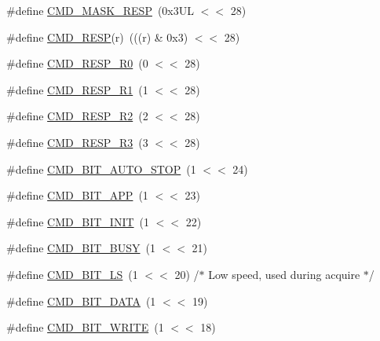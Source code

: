 \begin{DoxyCompactItemize}
\item 
\#define \hyperlink{group___s_d_m_m_c__18_x_x__43_x_x_gab956d2cc0062315242a2ccd388f1e358}{C\+M\+D\+\_\+\+M\+A\+S\+K\+\_\+\+R\+E\+SP}~(0x3\+U\+L $<$$<$ 28)
\item 
\#define \hyperlink{group___s_d_m_m_c__18_x_x__43_x_x_ga91c1b8c0d47030e80d4ff6259b169175}{C\+M\+D\+\_\+\+R\+E\+SP}(r)~(((r) \& 0x3) $<$$<$ 28)
\item 
\#define \hyperlink{group___s_d_m_m_c__18_x_x__43_x_x_ga8a85b87724ffe5fa4d558ae128f21585}{C\+M\+D\+\_\+\+R\+E\+S\+P\+\_\+\+R0}~(0 $<$$<$ 28)
\item 
\#define \hyperlink{group___s_d_m_m_c__18_x_x__43_x_x_ga6f03bbba43ba479f018f7ef76e2258f5}{C\+M\+D\+\_\+\+R\+E\+S\+P\+\_\+\+R1}~(1 $<$$<$ 28)
\item 
\#define \hyperlink{group___s_d_m_m_c__18_x_x__43_x_x_ga3e9cc9d9af65b99b95dc6139a3db322a}{C\+M\+D\+\_\+\+R\+E\+S\+P\+\_\+\+R2}~(2 $<$$<$ 28)
\item 
\#define \hyperlink{group___s_d_m_m_c__18_x_x__43_x_x_gaa401bdbd962023c1773d917a2c99b110}{C\+M\+D\+\_\+\+R\+E\+S\+P\+\_\+\+R3}~(3 $<$$<$ 28)
\item 
\#define \hyperlink{group___s_d_m_m_c__18_x_x__43_x_x_ga54467a0e80fd68c54419d4e6598c05d8}{C\+M\+D\+\_\+\+B\+I\+T\+\_\+\+A\+U\+T\+O\+\_\+\+S\+T\+OP}~(1 $<$$<$ 24)
\item 
\#define \hyperlink{group___s_d_m_m_c__18_x_x__43_x_x_ga201daaaa1ac9cd5e8e9c6cc3a1472038}{C\+M\+D\+\_\+\+B\+I\+T\+\_\+\+A\+PP}~(1 $<$$<$ 23)
\item 
\#define \hyperlink{group___s_d_m_m_c__18_x_x__43_x_x_gaddd67f85312e1b1fb2d2a83a540a4427}{C\+M\+D\+\_\+\+B\+I\+T\+\_\+\+I\+N\+IT}~(1 $<$$<$ 22)
\item 
\#define \hyperlink{group___s_d_m_m_c__18_x_x__43_x_x_gaad6daa707d0fd2762f906bd1dc2cc240}{C\+M\+D\+\_\+\+B\+I\+T\+\_\+\+B\+U\+SY}~(1 $<$$<$ 21)
\item 
\#define \hyperlink{group___s_d_m_m_c__18_x_x__43_x_x_gac7c44bedf5c41fd5ed18712aa2ef69a7}{C\+M\+D\+\_\+\+B\+I\+T\+\_\+\+LS}~(1 $<$$<$ 20)	/$\ast$ Low speed, used during acquire $\ast$/
\item 
\#define \hyperlink{group___s_d_m_m_c__18_x_x__43_x_x_gac4b629fb5a202bac675389cf3e28a197}{C\+M\+D\+\_\+\+B\+I\+T\+\_\+\+D\+A\+TA}~(1 $<$$<$ 19)
\item 
\#define \hyperlink{group___s_d_m_m_c__18_x_x__43_x_x_ga78e0e4e25dd9e13cdcbecc9f396b2150}{C\+M\+D\+\_\+\+B\+I\+T\+\_\+\+W\+R\+I\+TE}~(1 $<$$<$ 18)
$$
\end{DoxyCompactItemize}

